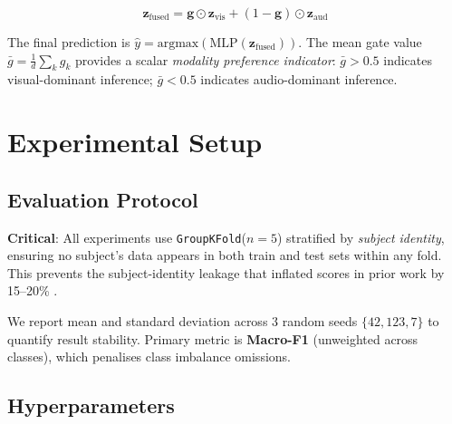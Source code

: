 \documentclass[conference]{IEEEtran}
\begin{document}
\begin{equation}
  \mathbf{z}_{\text{fused}} = \mathbf{g} \odot \mathbf{z}_{\text{vis}} + 
    (1-\mathbf{g}) \odot \mathbf{z}_{\text{aud}}
  \label{eq:fusion}
\end{equation}

The final prediction is $\hat{y} = \text{argmax}(\text{MLP}(\mathbf{z}_{\text{fused}}))$.
The mean gate value $\bar{g} = \frac{1}{d}\sum_k g_k$ provides a scalar 
\textit{modality preference indicator}: 
$\bar{g} > 0.5$ indicates visual-dominant inference; 
$\bar{g} < 0.5$ indicates audio-dominant inference.

\section{Experimental Setup}
\label{sec:eval}

\subsection{Evaluation Protocol}

\textbf{Critical}: All experiments use \texttt{GroupKFold}($n{=}5$) stratified 
by \textit{subject identity}, ensuring no subject's data appears in both train 
and test sets within any fold. This prevents the subject-identity leakage that 
inflated scores in prior work by 15–20\% \cite{Zhao2023}.

We report mean and standard deviation across 3 random seeds 
$\{42, 123, 7\}$ to quantify result stability. Primary metric is \textbf{Macro-F1} 
(unweighted across classes), which penalises class imbalance omissions.

\subsection{Hyperparameters}
\end{document}
